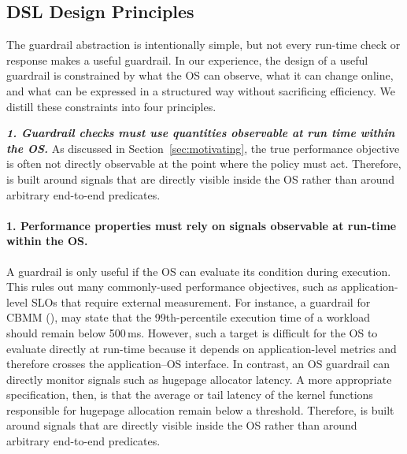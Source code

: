 \subsection{DSL Design Principles }\label{subsec:design-principles}

The guardrail abstraction is intentionally simple, but not every run-time check or response makes a useful guardrail. In our experience, the design of a useful guardrail is constrained by what the OS can observe, what it can change online, and what can be expressed in a structured way without sacrificing efficiency.
We distill these constraints into four principles.

\medskip\noindent
{\it \textbf{1.  Guardrail checks must use quantities observable at run time within the OS.}}
As discussed in Section~\ref{sec:motivating}, the true performance objective is often not directly observable at the point where the policy must act. Therefore, \lang is built around signals that are directly visible inside the OS rather than around arbitrary end-to-end predicates. %

\iffalse
\paragraph{1. Performance properties must rely on signals observable at run-time within the OS.}
A guardrail is only useful if the OS can evaluate its condition during execution. This rules out many commonly-used performance objectives, such as application-level SLOs that require external measurement. For instance, a guardrail for CBMM (), may state that the 99th-percentile execution time of a workload should remain below 500\,ms.
However, such a target is difficult for the OS to evaluate directly at run-time because it depends on application-level metrics and therefore crosses the application--OS interface. In contrast, an OS guardrail can directly monitor signals such as hugepage allocator latency. A more appropriate specification, then, is that the average or tail latency of the kernel functions responsible for hugepage allocation remain below a threshold.
Therefore, \lang is built around signals that are directly visible inside the OS rather than around arbitrary end-to-end predicates.


